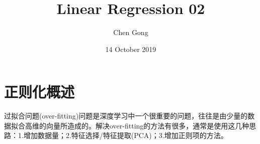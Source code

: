 \documentclass[a4paper]{article}
\title{Linear Regression 02}
\author{Chen Gong}
\date{14 October 2019}
\begin{document}
\maketitle







\section{正则化概述}
过拟合问题(over-fitting)问题是深度学习中一个很重要的问题，往往是由少量的数据拟合高维的向量所造成的。解决over-fitting的方法有很多，通常是使用这几种思路：1.增加数据量；2.特征选择/特征提取(PCA)；3.增加正则项的方法。
\end{document}
